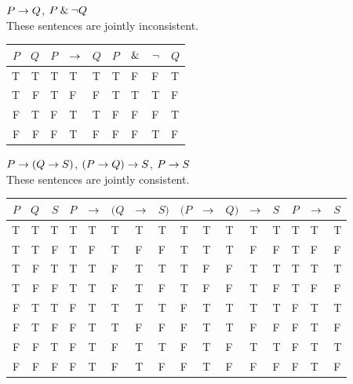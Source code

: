 \begin{small}
\begin{earg}
\item $P \rightarrow Q$, $P \mathbin{\&} {\neg} Q$ \\
These sentences are jointly inconsistent.
\begin{flushleft}
\begin{tabular}{d d | f e h | f e e e}
$P$ & $Q$ & $P$ & $\rightarrow$ & $Q$ & $P$ & $\mathbin{\&}$ & ${\neg}$ & $Q$\\
\hline
T & T &    T & T & T &     T & F & F & T\Tstrut\\
T & F &    T & F & F &     T & T & T & F\\
F & T &    F & T & T &     F & F & F & T\\
F & F &    F & T & F &     F & F & T & F
\end{tabular}
\end{flushleft}\medskip

\item $P \rightarrow (Q \rightarrow S)$, $(P \rightarrow Q) \rightarrow S$, $P \rightarrow S$\\
These sentences are jointly consistent.
\begin{flushleft}
\begin{tabular}{d d d | f e e e h | f e e e h | f e e}
$P$ & $Q$ & $S$ & $P$ & $\rightarrow$ & $(Q$ & $\rightarrow$ & $S)$ & $(P$ & $\rightarrow$ & $Q)$ & $\rightarrow$ & $S$ & $P$ & $\rightarrow$ & $S$\\
\hline
T & T & T &    T & T &   T & T & T &          T & T & T &   T & T &     T & T & T\Tstrut\\
T & T & F &    T & F &   T & F & F &          T & T & T &   F & F &      T & F & F\\
T & F & T &    T & T &   F & T & T &          T & F & F &   T & T &      T & T & T\\
T & F & F &    T & T &   F & T & F &          T & F & F &   T & F &      T & F & F\\\hline
F & T & T &    F & T &   T & T & T &          F & T & T &   T & T &     F & T & T\Tstrut\\
F & T & F &    F & T &   T & F & F &          F & T & T &   F & F &      F & T & F\\
F & F & T &    F & T &   F & T & T &          F & T & F &   T & T &      F & T & T\\
F & F & F &    F & T &   F & T & F &          F & T & F  &  F & F  &     F & T & F 
\end{tabular}
\end{flushleft}\medskip


\end{earg}
\end{small}

